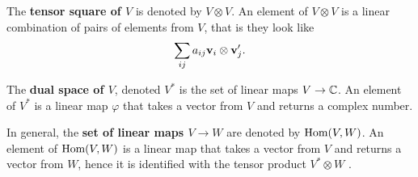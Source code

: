 \begin{example}
	The \textbf{tensor square of $V$} is denoted by $V \otimes V$. An element of $V \otimes V$ is a linear combination of pairs of elements from $V$, that is they look like
	\begin{align*}
		\sum_{ij} a_{ij} \mathbf{v}_i \otimes \mathbf{v}'_j.
	\end{align*}
%	
%	
\end{example}

The \textbf{dual space of $V$}, denoted $V^*$ is the set of linear maps $V \rightarrow \mathbb{C}$. An element of $V^*$ is a linear map $\varphi$ that takes a vector from $V$ and returns a complex number.

In general, the \textbf{set of linear maps $V \rightarrow W$} are denoted by $\text{Hom}(V,W)$. An element of $\text{Hom}(V,W)$ is a linear map that takes a vector from $V$ and returns a vector from $W$, hence it is identified with the tensor product $V^* \otimes W$ \cite[Sect.1.1.]{FultonHarris}.

